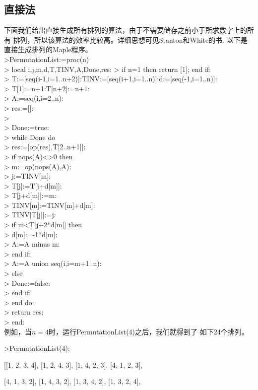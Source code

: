 \documentclass[a4paper,11pt,twoside]{book}
\begin{document}
\subsection{直接法}
下面我们给出直接生成所有排列的算法，由于不需要储存之前小于所求数字上的所有
排列，所以该算法的效率比较高。详细思想可见Stanton和White的书\cite{SW}. 以下是
直接生成排列的Maple程序。
\\
>PermutationList:=proc(n)\\
> local i,j,m,d,T,TINV,A,Done,res:
> if n=1 then return [1]; end if:  \\
> T:=[seq(i-1,i=1..n+2)]:TINV:=[seq(i+1,i=1..n)]:d:=[seq(-1,i=1..n)]:\\
> T[1]:=n+1:T[n+2]:=n+1:\\
> A:={seq(i,i=2..n)}:\\
> res:=[]:\\
>\\
> Done:=true:\\
> while Done do\\
>     res:=[op(res),T[2..n+1]]:\\
>     if nops(A)<>0 then\\
>         m:=op(nops(A),A):\\
>         j:=TINV[m]:\\
>         T[j]:=T[j+d[m]]:\\
>         T[j+d[m]]:=m:\\
>         TINV[m]:=TINV[m]+d[m]:\\
>         TINV[T[j]]:=j:\\
>         if m<T[j+2*d[m]] then\\
>            d[m]:=-1*d[m]:\\
>            A:=A minus {m}:\\
>         end if:\\
>         A:=A union {seq(i,i=m+1..n)}:\\
>     else\\
>         Done:=false:\\
>     end if:\\
> end do:\\
> return res;\\
> end:\\


例如，当$n=4$时，运行PermutationList(4)之后，我们就得到了
如下24个排列。

>PermutationList(4);

  [[1, 2, 3, 4], [1, 2, 4, 3], [1, 4, 2, 3], [4, 1, 2, 3],

        [4, 1, 3, 2], [1, 4, 3, 2], [1, 3, 4, 2], [1, 3, 2, 4],
\end{document}
